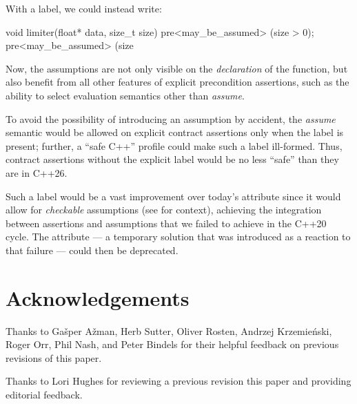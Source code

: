 {With a  label, we could instead write:
\begin{codeblock}
void limiter(float* data, size_t size)
  pre<may_be_assumed> (size > 0);
  pre<may_be_assumed> (size %
\end{codeblock}
Now, the assumptions are not only visible on the \emph{declaration} of the function, but also benefit from all other features of explicit precondition assertions, such as the ability to select evaluation semantics other than \emph{assume}.

To avoid the possibility of introducing an assumption by accident, the \emph{assume} semantic would be allowed on explicit contract assertions only when the \mbox{} label is present; further, a ``safe C++'' profile could make such a label ill-formed. Thus, contract assertions without the explicit label would be no less ``safe'' than they are in C++26.

Such a label would be a vast improvement over today's \tcode{[[assume]]} attribute since it would allow for \emph{checkable} assumptions (see \cite{P2064R0} for context), achieving the integration between assertions and assumptions that we failed to achieve in the C++20 cycle. The \tcode{[[assume]]} attribute --- a temporary solution that was introduced as a reaction to that failure --- could then be deprecated.


\section*{Acknowledgements}

Thanks to Ga\v{s}per A\v{z}man, Herb Sutter, Oliver Rosten, Andrzej Krzemie{\'n}ski, Roger Orr, Phil Nash, and Peter Bindels for their helpful feedback on previous revisions of this paper.

Thanks to Lori Hughes for reviewing a previous revision this paper and providing editorial feedback. 


}

